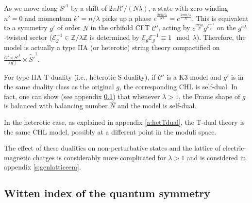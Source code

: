 \documentclass[a4paper,11pt]{article}
\newcommand{\ZZ}{\mathbb{Z}}
\newcommand{\C}{\mathcal{C}}
\newcommand{\E}{\mathcal{E}}
\numberwithin{equation}{section}
\begin{document}
As we move along $S'^1$ by a shift of $2\pi R'/(N\lambda)$, a state with zero winding $n'=0$ and momentum $k'=n/\lambda$ picks up a phase $e^{\frac{2\pi i k'\lambda}{N\lambda}}=e^{\frac{2\pi i n/\lambda}{N}}$. This is equivalent to a symmetry $g'$ of order $N$ in the orbifold CFT $\C'$, acting by $e^{\frac{2\pi i a}{N}}g^{\E_g^{-1}}$ on the $g^{a\lambda}$-twisted sector ($\E_g^{-1}\in \ZZ/\lambda\ZZ$ is determined by $\E_g\E_g^{-1}\equiv 1\mod \lambda$). Therefore, the model is actually a type IIA (or heterotic) string theory compactified on  $\frac{\C'\times {S'}^1}{\langle g'\rangle}\times \tilde {S'}^1$.  


For type IIA T-duality (i.e., heterotic S-duality), if $\C'$ is a K3 model and $g'$ is in the same duality class as the original $g$, the corresponding CHL is self-dual. In fact, one can show (see appendix \ref{a:quantsymm}) that whenever $\lambda>1$, the Frame shape of $g$ is balanced with balancing number $\hat N$ and the model is self-dual. 

In the heterotic case, as explained in appendix \ref{a:hetTdual}, the T-dual theory is the same CHL model, possibly at a different point in the moduli space. 

The effect of these dualities on non-perturbative states and the lattice of electric-magnetic charges is considerably more complicated for $\lambda>1$ and is considered in appendix \ref{s:genlatticeem}.

\subsection{Witten index of the quantum symmetry}

\label{a:quantsymm}
\end{document}

